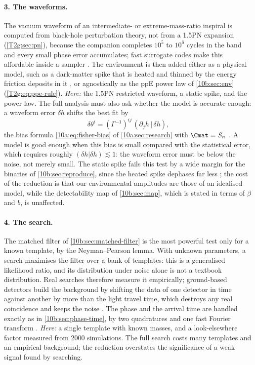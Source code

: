 \paragraph{3. The waveforms.} The vacuum waveform of an intermediate- or extreme-mass-ratio inspiral is computed from
black-hole perturbation theory, not from a 1.5PN expansion (\cref{T2g:sec:pn}), because the companion completes $10^5$ to $10^6$ cycles in
the band and every small phase error accumulates; fast surrogate codes make this affordable inside a sampler
\cite{KatzFEW2021}. The environment is then added either as a physical model, such as a dark-matter spike that is heated
and thinned by the energy friction deposits in it \cite{Kavanagh2020,Coogan2022}, or agnostically as the ppE power law
of \cref{10b:sec:env} (\cref{T2g:eq:ppe-rule}). \emph{Here:} the 1.5PN restricted waveform, a static spike, and the power law. The full
analysis must also ask whether the model is accurate enough: a waveform error $\delta h$ shifts the best fit by
\begin{equation}
  \delta\theta^i=(\Gamma^{-1})^{ij}\,(\partial_jh\,|\,\delta h),
  \label{10b:eq:waveform-bias}
\end{equation}
the bias formula \eqref{10a:eq:fisher-bias} of \cref{10a:sec:research} with $\Cmat=S_n$ \cite{CutlerVallisneri2007}. A model is
good enough when this bias is small compared with the statistical error, which requires roughly $(\delta h|\delta
h)\lesssim1$: the waveform error must be below the noise, not merely small. The static spike fails this test by a wide
margin for the binaries of \cref{10b:sec:reproduce}, since the heated spike dephases far less
\cite{Kavanagh2020,Coogan2022}; the cost of the reduction is that our environmental amplitudes are those of an idealised
model, while the detectability map of \cref{10b:sec:map}, which is stated in terms of $\beta$ and $b$, is unaffected.

\paragraph{4. The search.} The matched filter of \cref{10b:sec:matched-filter} is the most powerful test only for a known
template, by the Neyman--Pearson lemma. With unknown parameters, a search maximises the filter over a bank of templates:
this is a generalised likelihood ratio, and its distribution under noise alone is not a textbook distribution. Real
searches therefore measure it empirically; ground-based detectors build the background by shifting the data of one
detector in time against another by more than the light travel time, which destroys any real coincidence and keeps the
noise \cite{UsmanPyCBC2016,LIGOGuide2020}. The phase and the arrival time are handled exactly as in
\cref{10b:sec:phase-time}, by two quadratures and one fast Fourier transform \cite{AllenFINDCHIRP2012}. \emph{Here:} a single
template with known masses, and a look-elsewhere factor measured from $2000$ simulations. The full search costs many
templates and an empirical background; the reduction overstates the significance of a weak signal found by searching.


